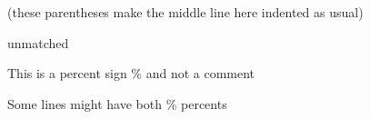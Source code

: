 \documentclass{article}
\begin{document}
(these parentheses
make the middle line here
indented as usual)


unmatched %

This is a percent sign \% and not a comment

Some lines might have both \% percents %
\end{document}
